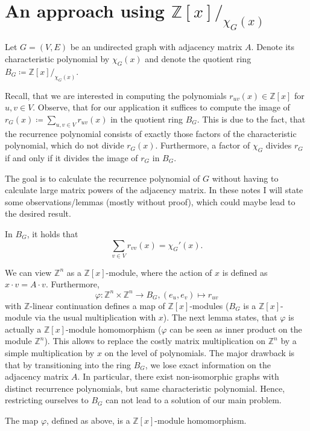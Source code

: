 \documentclass[a4paper,12pt]{article}
\begin{document}
\section{An approach using $\mathbb{Z}[x]/_{\chi_G(x)}$}

Let $G = (V,E)$ be an undirected graph with adjacency matrix $A$. Denote its characteristic polynomial by $\chi_G(x)$ and denote the quotient ring $B_G \coloneqq \mathbb{Z}[x]/_{\chi_G(x)}$.

Recall, that we are interested in computing the polynomials $r_{uv}(x) \in \mathbb{Z}[x]$ for $u,v\in V$. Observe, that for our application it suffices to compute the image of $r_G(x) \coloneqq \sum_{u,v\in V} r_{uv}(x)$ in the quotient ring $B_G$. This is due to the fact, that the recurrence polynomial consists of exactly those factors of the characteristic polynomial, which do not divide $r_G(x)$. Furthermore, a factor of $\chi_G$ divides $r_G$ if and only if it divides the image of $r_G$ in $B_G$.

The goal is to calculate the recurrence polynomial of $G$ without having to calculate large matrix powers of the adjacency matrix. In these notes I will state some observations/lemmas (mostly without proof), which could maybe lead to the desired result.

\begin{lemma}
In $B_G$, it holds that
$$
\sum_{v\in V}r_{vv}(x) = \chi_G'(x).
$$
\end{lemma}

We can view $\mathbb{Z}^n$ as a $\mathbb{Z}[x]$-module, where the action of $x$ is defined as $x \cdot v = A\cdot v$. Furthermore,
$$
\varphi \colon \mathbb{Z}^n \times \mathbb{Z}^n \to B_G, (e_u, e_v) \mapsto r_{uv}
$$
with $\mathbb{Z}$-linear continuation defines a map of $\mathbb{Z}[x]$-modules ($B_G$ is a $\mathbb{Z}[x]$-module via the usual multiplication with $x$). The next lemma states, that $\varphi$ is actually a $\mathbb{Z}[x]$-module homomorphism ($\varphi$ can be seen as inner product on the module $\mathbb{Z}^n$). This allows to replace the costly matrix multiplication on $\mathbb{Z}^n$ by a simple multiplication by $x$ on the level of polynomials. The major drawback is that by transitioning into the ring $B_G$, we lose exact information on the adjacency matrix $A$. In particular, there exist non-isomorphic graphs with distinct recurrence polynomials, but same characteristic polynomial. Hence, restricting ourselves to $B_G$ can not lead to a solution of our main problem.

\begin{lemma}
The map $\varphi$, defined as above, is a $\mathbb{Z}[x]$-module homomorphism.
\end{lemma}
\end{document}
